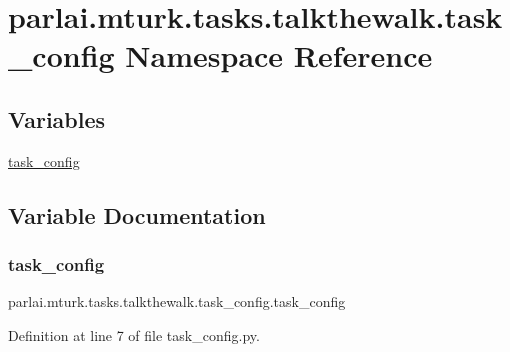 \hypertarget{namespaceparlai_1_1mturk_1_1tasks_1_1talkthewalk_1_1task__config}{}\section{parlai.\+mturk.\+tasks.\+talkthewalk.\+task\+\_\+config Namespace Reference}
\label{namespaceparlai_1_1mturk_1_1tasks_1_1talkthewalk_1_1task__config}
\subsection*{Variables}
\begin{DoxyCompactItemize}
\item 
\hyperlink{namespaceparlai_1_1mturk_1_1tasks_1_1talkthewalk_1_1task__config_ac62d8b2b9895fab13d6d344c109df514}{task\+\_\+config}
\end{DoxyCompactItemize}


\subsection{Variable Documentation}
\mbox{\label{namespaceparlai_1_1mturk_1_1tasks_1_1talkthewalk_1_1task__config_ac62d8b2b9895fab13d6d344c109df514}} 
\subsubsection{\texorpdfstring{task\+\_\+config}{task\_config}}
{\footnotesize\ttfamily parlai.\+mturk.\+tasks.\+talkthewalk.\+task\+\_\+config.\+task\+\_\+config}



Definition at line 7 of file task\+\_\+config.\+py.


